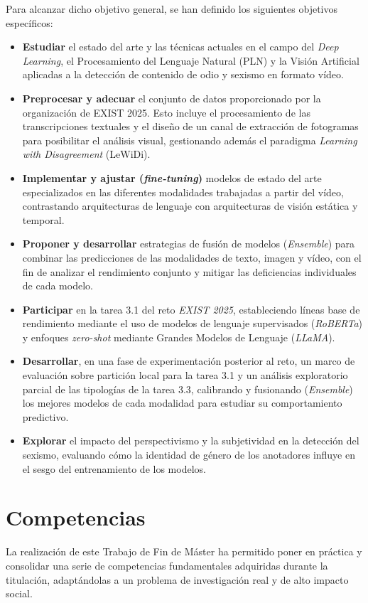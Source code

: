 Para alcanzar dicho objetivo general, se han definido los siguientes objetivos específicos:
\begin{itemize}
    \item \textbf{Estudiar} el estado del arte y las técnicas actuales en el campo del \textit{Deep Learning}, el Procesamiento del Lenguaje Natural (PLN) y la Visión Artificial aplicadas a la detección de contenido de odio y sexismo en formato vídeo. 
    \item \textbf{Preprocesar y adecuar} el conjunto de datos proporcionado por la organización de EXIST 2025. Esto incluye el procesamiento de las transcripciones textuales y el diseño de un canal de extracción de fotogramas para posibilitar el análisis visual, gestionando además el paradigma \textit{Learning with Disagreement} (LeWiDi).
    \item \textbf{Implementar y ajustar (\textit{fine-tuning})} modelos de estado del arte especializados en las diferentes modalidades trabajadas a partir del vídeo, contrastando arquitecturas de lenguaje con arquitecturas de visión estática y temporal.
    \item \textbf{Proponer y desarrollar} estrategias de fusión de modelos (\textit{Ensemble}) para combinar las predicciones de las modalidades de texto, imagen y vídeo, con el fin de analizar el rendimiento conjunto y mitigar las deficiencias individuales de cada modelo. 
    \item \textbf{Participar} en la tarea 3.1 del reto \textit{EXIST 2025}, estableciendo líneas base de rendimiento mediante el uso de modelos de lenguaje supervisados (\textit{RoBERTa}) y enfoques \textit{zero-shot} mediante Grandes Modelos de Lenguaje (\textit{LLaMA}).
    \item \textbf{Desarrollar}, en una fase de experimentación posterior al reto, un marco de evaluación sobre partición local para la tarea 3.1 y un análisis exploratorio parcial de las tipologías de la tarea 3.3, calibrando y fusionando (\textit{Ensemble}) los mejores modelos de cada modalidad para estudiar su comportamiento predictivo.
    \item \textbf{Explorar} el impacto del perspectivismo y la subjetividad en la detección del sexismo, evaluando cómo la identidad de género de los anotadores influye en el sesgo del entrenamiento de los modelos. 
\end{itemize}

\section{Competencias}
\label{sec:Competencias}
La realización de este Trabajo de Fin de Máster ha permitido poner en práctica y consolidar una serie de competencias fundamentales adquiridas durante la titulación, adaptándolas a un problema de investigación real y de alto impacto social. 

